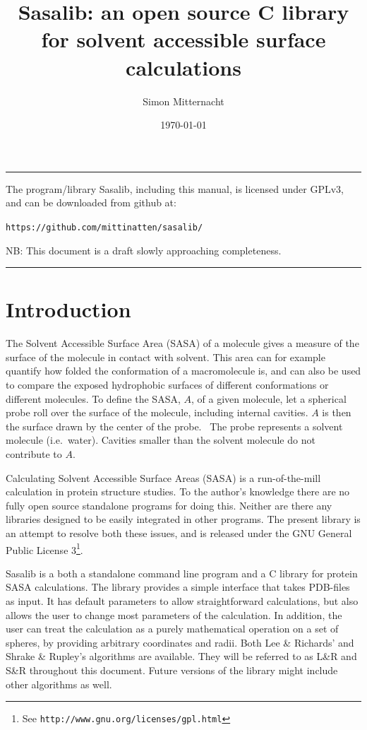 \documentclass[a4paper,11pt]{article}
\author{Simon Mitternacht}
\date{\today}
\title{Sasalib: an open source C library for solvent accessible surface
  calculations}
\begin{document}
\maketitle
\hrule\vspace{0.5cm}
\noindent
The program/library Sasalib, including this manual, is licensed under
GPLv3, and can be downloaded from github at: 
\begin{center}
\texttt{https://github.com/mittinatten/sasalib/}
\end{center}
NB: This document is a draft slowly approaching completeness.
\vspace{0.5cm}
\hrule
\section{Introduction}
The Solvent Accessible Surface Area (SASA) of a molecule gives a
measure of the surface of the molecule in contact with solvent. This
area can for example quantify how folded the conformation of a
macromolecule is, and can also be used to compare the exposed
hydrophobic surfaces of different conformations or different
molecules. To define the SASA, $A$, of a given molecule, let a
spherical probe roll over the surface of the molecule, including
internal cavities. $A$ is then the surface drawn by the center of the
probe.~\cite{LnR} The probe represents a solvent molecule
(i.e.\ water). Cavities smaller than the solvent molecule do not
contribute to $A$.

Calculating Solvent Accessible Surface Areas (SASA) is a
run-of-the-mill calculation in protein structure studies. To the
author's knowledge there are no fully open source standalone programs
for doing this. Neither are there any libraries designed to be easily
integrated in other programs. The present library is an attempt to
resolve both these issues, and is released under the GNU General
Public License 3\footnote{See
  \texttt{http://www.gnu.org/licenses/gpl.html}}.

Sasalib is a both a standalone command line program and a C library
for protein SASA calculations. The library provides a simple interface
that takes PDB-files as input. It has default parameters to allow
straightforward calculations, but also allows the user to change most
parameters of the calculation. In addition, the user can treat the
calculation as a purely mathematical operation on a set of spheres, by
providing arbitrary coordinates and radii. Both Lee \& Richards'
\cite{LnR} and Shrake \& Rupley's \cite{SnR} algorithms are
available. They will be referred to as L\&R and S\&R throughout this
document. Future versions of the library might include other
algorithms as well.
\end{document}
